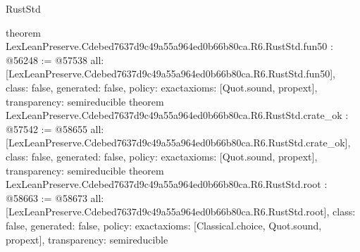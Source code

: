 \begin{lexlean}{RustStd}
\begin{coremodule}
{}
theorem LexLeanPreserve.Cdebed7637d9c49a55a964ed0b66b80ca.R6.RustStd.fun50 : @56248 := @57538 {
  all: [LexLeanPreserve.Cdebed7637d9c49a55a964ed0b66b80ca.R6.RustStd.fun50],
  class: false,
  generated: false,
  policy: exact{axioms: [Quot.sound, propext]},
  transparency: semireducible
}
theorem LexLeanPreserve.Cdebed7637d9c49a55a964ed0b66b80ca.R6.RustStd.crate_ok : @57542 := @58655 {
  all: [LexLeanPreserve.Cdebed7637d9c49a55a964ed0b66b80ca.R6.RustStd.crate_ok],
  class: false,
  generated: false,
  policy: exact{axioms: [Quot.sound, propext]},
  transparency: semireducible
}
theorem LexLeanPreserve.Cdebed7637d9c49a55a964ed0b66b80ca.R6.RustStd.root : @58663 := @58673 {
  all: [LexLeanPreserve.Cdebed7637d9c49a55a964ed0b66b80ca.R6.RustStd.root],
  class: false,
  generated: false,
  policy: exact{axioms: [Classical.choice, Quot.sound, propext]},
  transparency: semireducible
}


\end{coremodule}
\end{lexlean}
